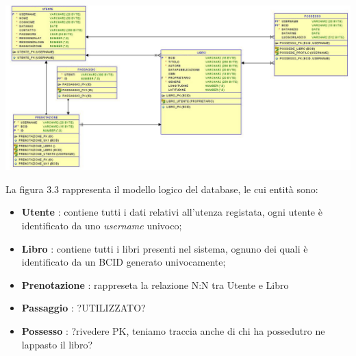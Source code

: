 \begin{center}
\begin{sideways}%
	\begin{minipage}{1.3\textwidth}
		\includegraphics[width=\linewidth,keepaspectratio]{Immagini/db_schema.jpg}
		\vspace{0.2cm}
		\label{fig:xx}
	\end{minipage}
\end{sideways}
\end{center}

La figura 3.3 rappresenta il modello logico del database, le cui entità sono:
\begin{itemize}
	\item \textbf{Utente} : contiene tutti i dati relativi all'utenza registata, ogni utente è identificato da uno \textit{username} univoco;
	\item \textbf{Libro} : contiene tutti i libri presenti nel sistema, ognuno dei quali è identificato da un BCID generato univocamente;
	\item \textbf{Prenotazione} : rappreseta la relazione N:N tra Utente e Libro
	\item \textbf{Passaggio} : ?UTILIZZATO?
	\item \textbf{Possesso} : ?rivedere PK, teniamo traccia anche di chi ha possedutro ne lappasto il libro?
\end{itemize}